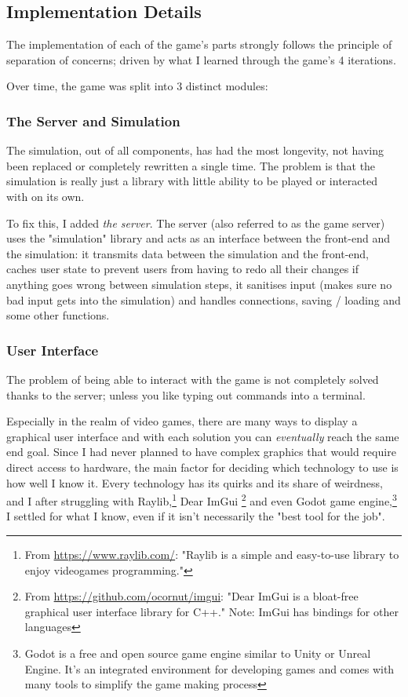 \subsection{Implementation Details}

The implementation of each of the game's parts strongly follows the principle of separation of concerns; driven by
what I learned through the game's 4 iterations.

Over time, the game was split into 3 distinct modules:

\subsubsection{The Server and Simulation}

The simulation, out of all components, has had the most longevity, not having been replaced or completely rewritten a
single time. The problem is that the simulation is really just a library with little ability to be played or interacted
with on its own.

To fix this, I added \textit{the server}. The server (also referred to as the game server) uses the "simulation"
library and acts as an interface between the front-end and the simulation: it transmits data between the simulation and
the front-end, caches user state to prevent users from having to redo all their changes if anything goes wrong between
simulation steps, it sanitises input (makes sure no bad input gets into the simulation) and handles connections, saving
/ loading and some other functions.

\subsubsection{User Interface}

The problem of being able to interact with the game is not completely solved thanks to the server; unless you like
typing out commands into a terminal.

Especially in the realm of video games, there are many ways to display a graphical user interface and with each solution
you can \textit{eventually} reach the same end goal. Since I had never
planned to have complex graphics that would require direct access to hardware, the main factor for deciding which
technology to use is how well I know it. Every technology has its quirks and its share of weirdness, and I after
struggling with Raylib,\footnote{From \href{https://www.raylib.com/}{https://www.raylib.com/}: "Raylib is a simple and
	easy-to-use library to enjoy videogames programming."} Dear ImGui \footnote{From
	\href{https://github.com/ocornut/imgui}{https://github.com/ocornut/imgui}: "Dear ImGui is a bloat-free graphical user
	interface library for C++." Note:  ImGui has bindings for other languages} and even Godot game engine,\footnote{Godot is
	a free and open source game engine similar to Unity or Unreal Engine. It's an integrated environment for developing
	games and comes with many tools to simplify the game making process} I settled for what I know, even if it isn't
necessarily the "best tool for the job".

